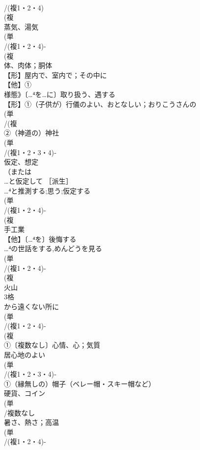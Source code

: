 \documentclass[8pt]{extreport}
\begin{document}
\begin{CJK}{UTF8}{min}
\\	/(複1・2・4)
\\	(複
\\	蒸気、湯気 
\\	(単
\\	/(複1・2・4)-
\\	(複
\\	体、肉体；胴体 
\\	【形】屋内で、室内で；その中に 
\\	【他】①
\\	様態》〔…⁴を…に〕取り扱う、遇する 
\\	【形】①（子供が）行儀のよい、おとなしい；おりこうさんの
\\	(単
\\	/(複
\\	②（神道の）神社 
\\	(単
\\	/(複1・2・3・4)‐
\\	仮定、想定 
\\	（または
\\	…と仮定して ［派生］ 
\\	…⁴と推測する;思う;仮定する
\\	(単
\\	/(複1・2・4)-
\\	(複
\\	手工業
\\	【他】〔…⁴を〕後悔する 
\\	…⁴の世話をする,めんどうを見る
\\	(単
\\	/(複1・2・4)-
\\	(複
\\	火山 
\\	3格	
\\	から遠くない所に
\\	(単
\\	/(複1・2・4)-
\\	(複
\\	①〔複数なし〕心情、心；気質 
\\	居心地のよい
\\	(単
\\	/(複1・2・3・4)‐
\\	①（縁無しの）帽子（ベレー帽・スキー帽など） 
\\	硬貨、コイン 
\\	(単
\\	/複数なし 
\\	暑さ、熱さ；高温 
\\	(単
\\	/(複1・2・4)-

\end{CJK}
\end{document}
